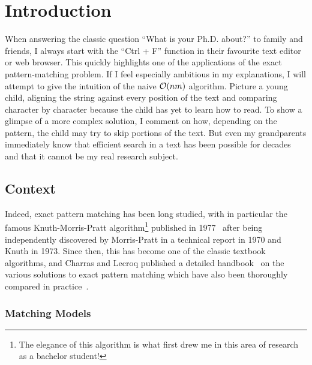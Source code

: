\chapter*{Introduction}\label{chap:intro}\setcounter{page}{1}\frontmatter
{}

When answering the classic question ``What is your Ph.D. about?'' to family and friends, I always start with the ``Ctrl + F'' function in their favourite text editor or web browser. This quickly highlights one of the applications of the exact pattern-matching problem. If I feel especially ambitious in my explanations, I will attempt to give the intuition of the naive $\mathcal{O}(nm)$ algorithm. Picture a young child, aligning the string against every position of the text and comparing character by character because the child has yet to learn how to read. To show a glimpse of a more complex solution, I comment on how, depending on the pattern, the child may try to skip portions of the text. But even my grandparents immediately know that efficient search in a text has been possible for decades and that it cannot be my real research subject.

\section{Context}

Indeed, exact pattern matching has been long studied, with in particular the famous Knuth-Morris-Pratt algorithm\footnote{The elegance of this algorithm is what first drew me in this area of research as a bachelor student!} published in 1977~\cite{KMP} after being independently discovered by Morris-Pratt in a technical report in 1970 and Knuth in 1973. Since then, this has become one of the classic textbook algorithms, and Charras and Lecroq published a detailed handbook~\cite{charras2004handbook} on the various solutions to exact pattern matching which have also been thoroughly compared in practice~\cite{DBLP:journals/corr/abs-1012-2547, faro2013exact}.


\subsection{Matching Models}\label{sec:intro:complex}




